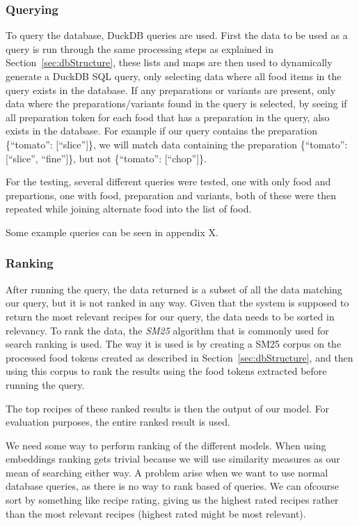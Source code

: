 \documentclass[11pt]{article}
\begin{document}
\subsubsection{Querying}
To query the database, DuckDB queries are used.
First the data to be used as a query is run through the same processing steps as
explained in Section~\ref{sec:dbStructure}, these lists and maps are then used
to dynamically generate a DuckDB SQL query, only selecting data where all food
items in the query exists in the database.
If any preparations or variants are present, only data where the
preparations/variants found in the query is selected, by seeing if all
preparation token for each food that has a preparation in the query, also exists
in the database.
For example if our query contains the preparation \{``tomato'': [``slice'']\},
we will match data containing the preparation \{``tomato'': [``slice'',
``fine'']\}, but not \{``tomato'': [``chop'']\}.

For the testing, several different queries were tested, one with only food and
prepartions, one with food, preparation and variants, both of these were then
repeated while joining alternate food into the list of food.

Some example queries can be seen in appendix X.

\subsubsection{Ranking}
After running the query, the data returned is a subset of all the data matching
our query, but it is not ranked in any way.
Given that the system is supposed to return the most relevant recipes for our
query, the data needs to be sorted in relevancy.
To rank the data, the \emph{SM25} algorithm that is commonly used for search
ranking is used.
The way it is used is by creating a SM25 corpus on the processed food tokens
created as described in Section~\ref{sec:dbStructure}, and then using this
corpus to rank the results using the food tokens extracted before running the
query.

The top recipes of these ranked results is then the output of our model.
For evaluation purposes, the entire ranked result is used.


\iffalse{}
We need some way to perform ranking of the different models.
When using embeddings ranking gets trivial because we will use similarity
measures as our mean of searching either way.
A problem arise when we want to use normal database queries, as there is no way
to rank based of queries.
We can ofcourse sort by something like recipe rating, giving us the highest
rated recipes rather than the most relevant recipes (highest rated might be most
relevant).
\end{document}
